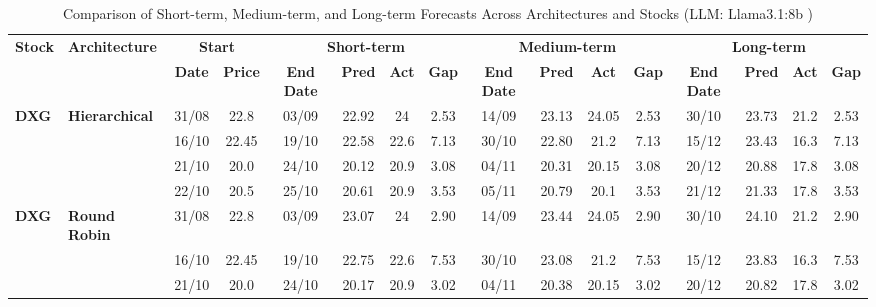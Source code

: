 \documentclass{ieeeaccess}
\begin{document}
\clearpage
\onecolumn  
\begin{table}[!h]
\centering
\caption{Comparison of Short-term, Medium-term, and Long-term Forecasts Across Architectures and Stocks (LLM: Llama3.1:8b )}
\label{tab:full_forecast}
\setlength{\tabcolsep}{3pt}
\renewcommand{\arraystretch}{1.05}
\scriptsize
\begin{tabular}{llcc|cccc|cccc|cccc}
\toprule
\multirow{2}{*}{\textbf{Stock}} &
\multirow{2}{*}{\textbf{Architecture}} &
\multicolumn{2}{c|}{\textbf{Start}} &
\multicolumn{4}{c|}{\textbf{Short-term}} &
\multicolumn{4}{c|}{\textbf{Medium-term}} &
\multicolumn{4}{c}{\textbf{Long-term}} \\
\cmidrule(lr){3-4}
\cmidrule(lr){5-8}
\cmidrule(lr){9-12}
\cmidrule(lr){13-16}
& &
\textbf{Date} & \textbf{Price} &
\textbf{End Date} & \textbf{Pred} & \textbf{Act} & \textbf{Gap} &
\textbf{End Date} & \textbf{Pred} & \textbf{Act} & \textbf{Gap} &
\textbf{End Date} & \textbf{Pred} & \textbf{Act} & \textbf{Gap} \\
\midrule


\multirow{4}{*}{\textbf{DXG}} 
& \textbf{Hierarchical}
& 31/08 & 22.8 & 03/09 & 22.92 & 24 & 2.53 & 14/09 & 23.13 & 24.05 & 2.53 & 30/10 & 23.73 & 21.2 & 2.53 \\

& 
& 16/10 & 22.45 & 19/10 & 22.58 & 22.6 & 7.13 & 30/10 & 22.80 & 21.2 & 7.13 & 15/12 & 23.43 & 16.3 & 7.13 \\

& 
& 21/10 & 20.0 & 24/10 & 20.12 & 20.9 & 3.08 & 04/11 & 20.31 & 20.15 & 3.08 & 20/12 & 20.88 & 17.8 & 3.08 \\

&
& 22/10 & 20.5 & 25/10 & 20.61 & 20.9 & 3.53 & 05/11 & 20.79 & 20.1 & 3.53 & 21/12 & 21.33 & 17.8 & 3.53 \\
\midrule


\multirow{4}{*}{\textbf{DXG}} 
& \textbf{Round Robin}
& 31/08 & 22.8 & 03/09 & 23.07 & 24 & 2.90 & 14/09 & 23.44 & 24.05 & 2.90 & 30/10 & 24.10 & 21.2 & 2.90 \\

&
& 16/10 & 22.45 & 19/10 & 22.75 & 22.6 & 7.53 & 30/10 & 23.08 & 21.2 & 7.53 & 15/12 & 23.83 & 16.3 & 7.53 \\

&
& 21/10 & 20.0 & 24/10 & 20.17 & 20.9 & 3.02 & 04/11 & 20.38 & 20.15 & 3.02 & 20/12 & 20.82 & 17.8 & 3.02 \\


\end{tabular}
\end{table}
\end{document}
